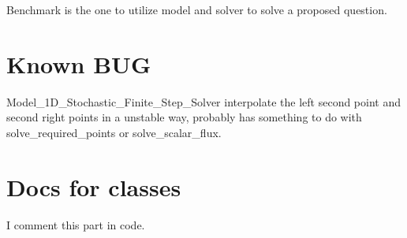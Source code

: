 \documentclass[letter,12pt]{article}
\begin{document}
Benchmark is the one to utilize model and solver to solve a proposed question.

\section{Known BUG}

Model\_1D\_Stochastic\_Finite\_Step\_Solver interpolate the left second point and second right points in a unstable way, probably has something to do with solve\_required\_points or solve\_scalar\_flux.

\section{Docs for classes}
I comment this part in code.
\end{document}
